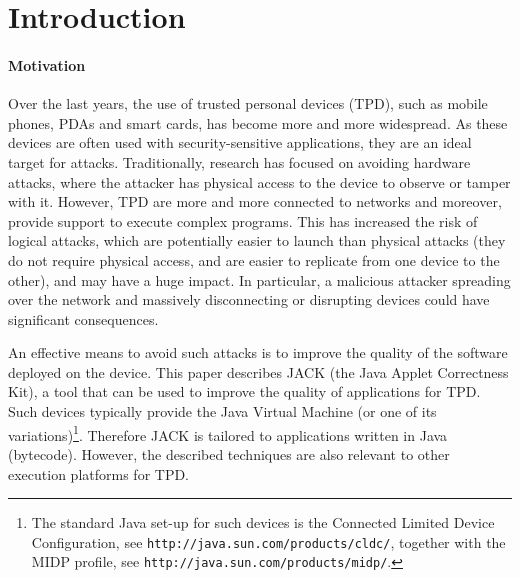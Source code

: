 \section{Introduction}\label{SecIntro}

\paragraph{Motivation}
Over the last years, the use of trusted personal devices (TPD), such
as mobile phones, PDAs and smart cards, has become more and more
widespread. As these devices are often used with security-sensitive
applications, they are an ideal target for attacks. Traditionally,
research has focused on avoiding hardware attacks, where the attacker
has physical access to the device to observe or tamper with
it. However, TPD are more and more connected to networks and moreover,
provide support to execute complex programs. This has increased the
risk of logical attacks, which are potentially easier to launch than
physical attacks (they do not require physical access, and are easier
to replicate from one device to the other), and may have a huge
impact.  In particular, a malicious attacker spreading over the
network and massively disconnecting or disrupting devices could have
significant consequences.

An effective means to avoid such attacks is to improve the quality of
the software deployed on the device. %
This paper describes JACK (the Java Applet Correctness Kit), a tool
that can be used to improve the quality of applications for TPD. Such
devices typically provide the Java Virtual Machine (or one of its
variations)\footnote{The standard Java set-up for such devices is the
Connected Limited Device Configuration, see
\texttt{http://java.sun.com/products/cldc/}, together with the MIDP
profile, see \texttt{http://java.sun.com/products/midp/}.}. Therefore
JACK is tailored to applications written in Java (bytecode). However,
the described techniques are also relevant to other execution
platforms for TPD.



